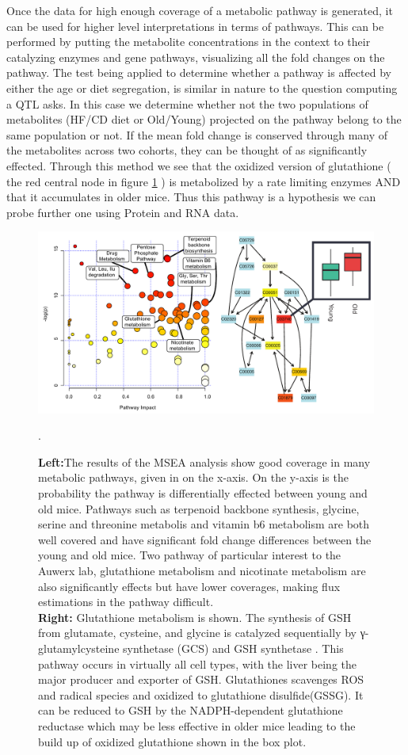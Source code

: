 \documentclass[a4paper,11pt,twoside]{book}
\begin{document}
	Once the data for high enough coverage of a metabolic pathway is generated, it can be used for higher level interpretations in terms of pathways. This can be performed by putting the metabolite concentrations in the context to their catalyzing enzymes and gene pathways, visualizing all the fold changes on the pathway. The test being applied to determine whether a pathway is affected by either the age or diet segregation, is similar in nature to the question computing a QTL asks. In this case we determine whether not the two populations of metabolites (HF/CD diet or Old/Young) projected on the pathway belong to the same population or not. If the mean fold change is conserved through many of the metabolites across two cohorts, they can be thought of as significantly effected\citep{Wishart2013}. Through this method we see that the oxidized version of glutathione ( the red central node in figure \ref{fig:MSEA} ) is metabolized by a rate limiting enzymes AND that it accumulates in older mice.  Thus this pathway is a hypothesis we can probe further one using Protein and RNA data.
	
	\begin{figure}
				\centering
		\includegraphics[width=0.99\linewidth]{3.Metabolomics/MSEA}
		\caption{\textbf{Left:}The results of the MSEA analysis show good coverage in many metabolic pathways, given in on the x-axis. On the y-axis is the probability the pathway is differentially effected between young and old mice. Pathways such as terpenoid backbone synthesis, glycine, serine and threonine metabolis and vitamin b6 metabolism are both well covered and have significant fold change differences between the young and old mice. Two pathway of particular interest to the Auwerx lab, glutathione metabolism and nicotinate metabolism are also significantly effects but have lower coverages, making flux estimations in the pathway difficult. \\ \textbf{Right:} Glutathione metabolism is shown. The synthesis of GSH from glutamate, cysteine, and glycine is catalyzed sequentially by γ-glutamylcysteine synthetase (GCS) and GSH synthetase . This pathway occurs in virtually all cell types, with the liver being the major producer and exporter of GSH. Glutathiones scavenges ROS and radical species and oxidized to glutathione disulfide(GSSG). It can be reduced to GSH by the NADPH-dependent glutathione reductase which may be less effective in older mice leading to the build up of oxidized glutathione shown in the box plot. \citep{Wu2004Glutathione}}. 
		\label{fig:MSEA}
	\end{figure}
	
\end{document}
